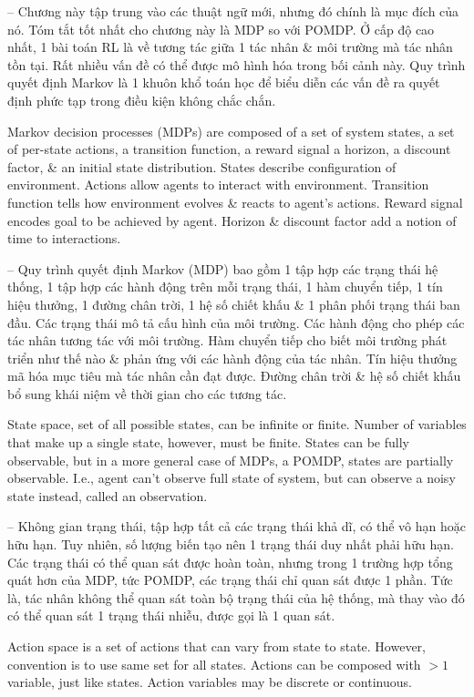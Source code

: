 \documentclass{article}
\begin{document}
\begin{itemize}
\begin{itemize}
        -- Chương này tập trung vào các thuật ngữ mới, nhưng đó chính là mục đích của nó. Tóm tắt tốt nhất cho chương này là MDP so với POMDP. Ở cấp độ cao nhất, 1 bài toán RL là về tương tác giữa 1 tác nhân \& môi trường mà tác nhân tồn tại. Rất nhiều vấn đề có thể được mô hình hóa trong bối cảnh này. Quy trình quyết định Markov là 1 khuôn khổ toán học để biểu diễn các vấn đề ra quyết định phức tạp trong điều kiện không chắc chắn.

        Markov decision processes (MDPs) are composed of a set of system states, a set of per-state actions, a transition function, a reward signal a horizon, a discount factor, \& an initial state distribution. States describe configuration of environment. Actions allow agents to interact with environment. Transition function tells how environment evolves \& reacts to agent's actions. Reward signal encodes goal to be achieved by agent. Horizon \& discount factor add a notion of time to interactions.

        -- Quy trình quyết định Markov (MDP) bao gồm 1 tập hợp các trạng thái hệ thống, 1 tập hợp các hành động trên mỗi trạng thái, 1 hàm chuyển tiếp, 1 tín hiệu thưởng, 1 đường chân trời, 1 hệ số chiết khấu \& 1 phân phối trạng thái ban đầu. Các trạng thái mô tả cấu hình của môi trường. Các hành động cho phép các tác nhân tương tác với môi trường. Hàm chuyển tiếp cho biết môi trường phát triển như thế nào \& phản ứng với các hành động của tác nhân. Tín hiệu thưởng mã hóa mục tiêu mà tác nhân cần đạt được. Đường chân trời \& hệ số chiết khấu bổ sung khái niệm về thời gian cho các tương tác.

        State space, set of all possible states, can be infinite or finite. Number of variables that make up a single state, however, must be finite. States can be fully observable, but in a more general case of MDPs, a POMDP, states are partially observable. I.e., agent can't observe full state of system, but can observe a noisy state instead, called an observation.

        -- Không gian trạng thái, tập hợp tất cả các trạng thái khả dĩ, có thể vô hạn hoặc hữu hạn. Tuy nhiên, số lượng biến tạo nên 1 trạng thái duy nhất phải hữu hạn. Các trạng thái có thể quan sát được hoàn toàn, nhưng trong 1 trường hợp tổng quát hơn của MDP, tức POMDP, các trạng thái chỉ quan sát được 1 phần. Tức là, tác nhân không thể quan sát toàn bộ trạng thái của hệ thống, mà thay vào đó có thể quan sát 1 trạng thái nhiễu, được gọi là 1 quan sát.

        Action space is a set of actions that can vary from state to state. However, convention is to use same set for all states. Actions can be composed with $> 1$ variable, just like states. Action variables may be discrete or continuous.


\end{itemize}
\end{itemize}
\end{document}
